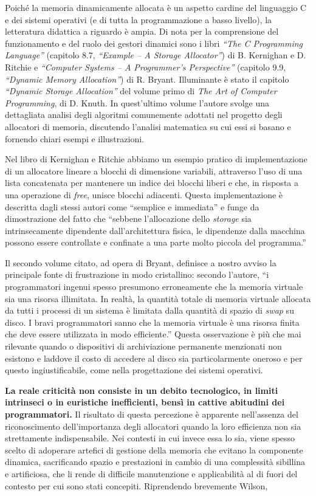 Poiché la memoria dinamicamente allocata è un aspetto cardine del linguaggio C e dei sistemi operativi (e di tutta la programmazione a basso livello), la letteratura didattica a riguardo è ampia. Di nota per la comprensione del funzionamento e del ruolo dei gestori dinamici sono i libri \textit{``The C Programming Language''} (capitolo 8.7, \textit{``Example – A Storage Allocator''}) di B. Kernighan e D. Ritchie\cite{kernighan1988} e \textit{``Computer Systems – A Programmer’s Perspective''} (capitolo 9.9, \textit{``Dynamic Memory Allocation''}) di R. Bryant\cite{bryant2015}. Illuminante è stato il capitolo \textit{``Dynamic Storage Allocation''} del volume primo di \textit{The Art of Computer Programming}, di D. Knuth\cite{knuth1997}. In quest'ultimo volume l'autore svolge una dettagliata analisi degli algoritmi comunemente adottati nel progetto degli allocatori di memoria, discutendo l’analisi matematica su cui essi si basano e fornendo chiari esempi e illustrazioni.

Nel libro di Kernighan e Ritchie abbiamo un esempio pratico di implementazione di un allocatore lineare a blocchi di dimensione variabili, attraverso l’uso di una lista concatenata per mantenere un indice dei blocchi liberi e che, in risposta a una operazione di \textit{free}, unisce blocchi adiacenti. Questa implementazione è descritta dagli stessi autori come ``semplice e immediata'' e funge da dimostrazione del fatto che ``sebbene l’allocazione dello \textit{storage} sia intrinsecamente dipendente dall’architettura fisica, le dipendenze dalla macchina possono essere controllate e confinate a una parte molto piccola del programma.''

Il secondo volume citato, ad opera di Bryant, definisce a nostro avviso la principale fonte di frustrazione in modo cristallino: secondo l’autore, ``i programmatori ingenui spesso presumono erroneamente che la memoria virtuale sia una risorsa illimitata. In realtà, la quantità totale di memoria virtuale allocata da tutti i processi di un sistema è limitata dalla quantità di spazio di \textit{swap} su disco. I bravi programmatori sanno che la memoria virtuale è una risorsa finita che deve essere utilizzata in modo efficiente.'' Questa osservazione è più che mai rilevante quando o dispositivi di archiviazione permanente menzionati non esistono e laddove il costo di accedere al disco sia particolarmente oneroso e per questo ingiustificabile, come nella progettazione dei sistemi operativi.

\textbf{La reale criticità non consiste in un debito tecnologico, in limiti intrinseci o in euristiche inefficienti, bensì in cattive abitudini dei programmatori.} Il risultato di questa percezione è apparente nell’assenza del riconoscimento dell’importanza degli allocatori quando la loro efficienza non sia strettamente indispensabile. Nei contesti in cui invece essa lo sia, viene spesso scelto di adoperare artefici di gestione della memoria che evitano la componente dinamica, sacrificando spazio e prestazioni in cambio di una complessità sibillina e artificiosa, che li rende di difficile manutenzione e applicabilità al di fuori del contesto per cui sono stati concepiti. Riprendendo brevemente Wilson,

